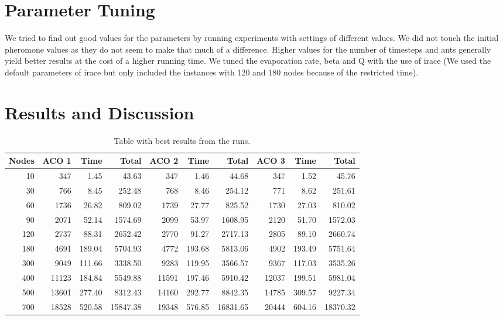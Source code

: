 \documentclass[a4paper]{scrartcl}
\begin{document}
\section{Parameter Tuning}
We tried to find out good values for the parameters by running experiments with settings of different values. We did not touch the initial pheromone values as they do not seem to make that much of a difference. Higher values for the number of timesteps and ants generally yield better results at the cost of a higher running time.
We tuned the evaporation rate, beta and Q with the use of irace \cite{lopez2011irace} (We used the default parameters of irace but only included the instances with 120 and 180 nodes because of the restricted time).


\section{Results and Discussion}


\begin{table}
    \begin{adjustwidth}{-.5in}{-.5in}  
        \begin{center}
\begin{tabular}{r | r | r | r | r | r | r | r | r | r}
\hline
Nodes & ACO 1 & Time & Total & ACO 2 & Time & Total & ACO 3 & Time & Total \\
\hline \hline 
10 & 347 & 1.45 & 43.63 & 347 & 1.46 & 44.68 & 347 & 1.52 & 45.76 \\
\hline
30 & 766 & 8.45 & 252.48 & 768 & 8.46 & 254.12 & 771 & 8.62 & 251.61 \\
\hline
60 & 1736 & 26.82 & 809.02 & 1739 & 27.77 & 825.52 & 1730 & 27.03 & 810.02 \\
\hline
90 & 2071 & 52.14 & 1574.69 & 2099 & 53.97 & 1608.95 & 2120 & 51.70 & 1572.03 \\
\hline
120 & 2737 & 88.31 & 2652.42 & 2770 & 91.27 & 2717.13 & 2805 & 89.10 & 2660.74 \\
\hline
180 & 4691 & 189.04 & 5704.93 & 4772 & 193.68 & 5813.06 & 4902 & 193.49 & 5751.64  \\
\hline
300 & 9049 & 111.66 & 3338.50 & 9283 & 119.95 & 3566.57 & 9367 & 117.03 & 3535.26 \\
\hline
400 & 11123 & 184.84 & 5549.88 & 11591 & 197.46 & 5910.42 & 12037 & 199.51 & 5981.04 \\
\hline
500 & 13601 & 277.40 & 8312.43 & 14160 & 292.77 & 8842.35 & 14785 & 309.57 & 9227.34 \\
\hline
700 & 18528 & 520.58 & 15847.38 & 19348 & 576.85 & 16831.65 & 20444 & 604.16 & 18370.32 \\
\hline
\end{tabular}

        \caption{Table with best results from the runs. }
        \label{myTable}
        \end{center}
    \end{adjustwidth}
\end{table}



\end{document}
